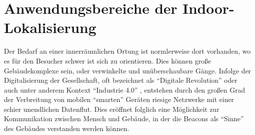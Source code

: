 \section{Anwendungsbereiche der Indoor-Lokalisierung}
Der Bedarf an einer innerräumlichen Ortung ist normlerweise dort vorhanden, wo es für den Besucher schwer ist sich zu orientieren. Dies können große Gebäudekomplexe sein, oder verwinkelte und unüberschaubare Gänge. Infolge der Digitalisierung der Gesellschaft, oft bezeichnet als "`Digitale Revolution"' oder auch unter anderem Kontext "`Industrie 4.0"' \cite{DigRev}, entstehen durch den großen Grad der Verbreitung von mobilen "`smarten"' Geräten riesige Netzwerke mit einer schier unendlichen Datenflut. Dies eröffnet folglich eine Möglichkeit zur Kommunikation zwischen Mensch und Gebäude, in der die Beacons als "`Sinne"' des Gebäudes verstanden werden können.  
